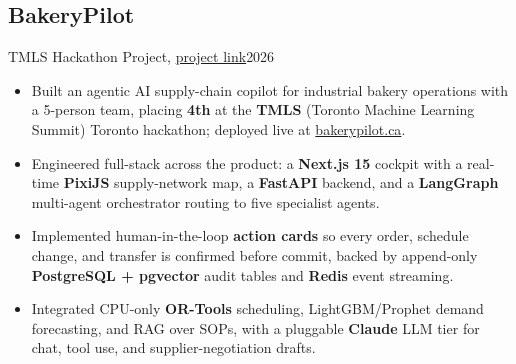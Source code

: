 \subsection{BakeryPilot}{TMLS Hackathon Project, \href{https://github.com/PantryPilot/BakeryPilot}{project link}}{2026}
\begin{itemize}
    \item Built an agentic AI supply-chain copilot for industrial bakery operations with a 5-person team, placing \textbf{4th} at the \textbf{TMLS} (Toronto Machine Learning Summit) Toronto hackathon; deployed live at \href{https://bakerypilot.ca}{bakerypilot.ca}.
    \item Engineered full-stack across the product: a \textbf{Next.js 15} cockpit with a real-time \textbf{PixiJS} supply-network map, a \textbf{FastAPI} backend, and a \textbf{LangGraph} multi-agent orchestrator routing to five specialist agents.
    \item Implemented human-in-the-loop \textbf{action cards} so every order, schedule change, and transfer is confirmed before commit, backed by append-only \textbf{PostgreSQL + pgvector} audit tables and \textbf{Redis} event streaming.
    \item Integrated CPU-only \textbf{OR-Tools} scheduling, LightGBM/Prophet demand forecasting, and RAG over SOPs, with a pluggable \textbf{Claude} LLM tier for chat, tool use, and supplier-negotiation drafts.
\end{itemize}

